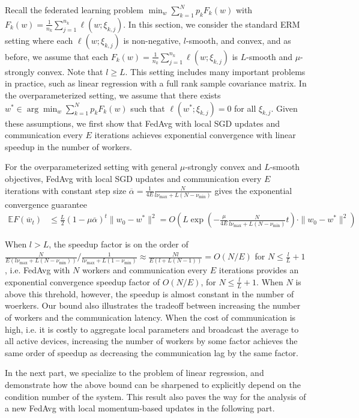 Recall the federated learning problem $\min_{w}\sum_{k=1}^{N}p_{k}F_{k}(w)$
with $F_{k}(w)=\frac{1}{n_{k}}\sum_{j=1}^{n_{k}}\ell(w;\xi_{k,j})$.
In this section, we consider the standard ERM setting where each $\ell(w;\xi_{k,j})$
is non-negative, $l$-smooth, and convex, and as before, we assume
that each $F_{k}(w)=\frac{1}{n_{k}}\sum_{j=1}^{n_{k}}\ell(w;\xi_{k,j})$
is $L$-smooth and $\mu$-strongly convex. Note that $l\geq L$. This
setting includes many important problems in practice, such as linear
regression with a full rank sample covariance matrix. In the overparameterized
setting, we assume that there exists $w^{\ast}\in\arg\min_{w}\sum_{k=1}^{N}p_{k}F_{k}(w)$
such that $\ell(w^{\ast};\xi_{k,j})=0$ for all $\xi_{k,j}$. Given
these assumptions, we first show that FedAvg with local SGD updates
and communication every $E$ iterations achieves exponential convergence
with linear speedup in the number of workers.
\begin{theorem}
	For the overparameterized setting with general $\mu$-strongly convex
	and $L$-smooth objectives, FedAvg with local SGD updates and communication
	every $E$ iterations with constant step size $\overline{\alpha}=\frac{1}{4E}\frac{N}{l\nu_{\max}+L(N-\nu_{\min})}$
	gives the exponential convergence guarantee 
	\begin{align*}
	\mathbb{E}F(\overline{w}_{t}) & \leq\frac{L}{2}(1-\mu\overline{\alpha})^{t}\|w_{0}-w^{\ast}\|^{2}=O(L\exp(-\frac{\mu}{4E}\frac{N}{l\nu_{\max}+L(N-\nu_{\min})}t)\cdot\|w_{0}-w^{\ast}\|^{2})
	\end{align*}
\end{theorem}
%
\begin{remark}
	When $l>L$, the speedup factor is on the order of $\frac{N}{E(l\nu_{\max}+L(N-\nu_{\min}))}/\frac{1}{l\nu_{\max}+L(1-\nu_{\min})}\approx\frac{Nl}{E(l+L(N-1))}=O(N/E)$
	for $N\leq\frac{l}{L}+1$, i.e. FedAvg with $N$ workers and communication
	every $E$ iterations provides an exponential convergence speedup
	factor of $O(N/E)$, for $N\leq\frac{l}{L}+1$. When $N$ is above
	this threhold, however, the speedup is almost constant in the number
	of woerkers. Our bound also illustrates the tradeoff between increasing
	the number of workers and the communication latency. When the cost
	of communication is high, i.e. it is costly to aggregate local parameters
	and broadcast the average to all active devices, increasing the number
	of workers by some factor achieves the same order of speedup as decreasing
	the communication lag by the same factor. 
\end{remark}
In the next part, we specialize to the problem of linear regression,
and demonstrate how the above bound can be sharpened to explicitly
depend on the condition number of the system. This result also paves
the way for the analysis of a new FedAvg with local momentum-based
updates in the following part. 

